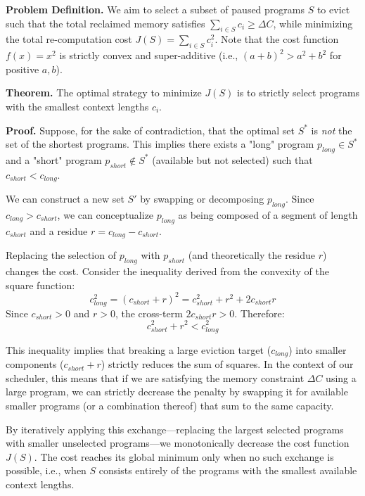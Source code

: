 \textbf{Problem Definition.}
We aim to select a subset of paused programs $S$ to evict such that the total reclaimed memory satisfies $\sum_{i \in S} c_i \ge \Delta C$, while minimizing the total re-computation cost $J(S) = \sum_{i \in S} c_i^2$. Note that the cost function $f(x) = x^2$ is strictly convex and super-additive (i.e., $(a+b)^2 > a^2 + b^2$ for positive $a, b$).

\textbf{Theorem.}
The optimal strategy to minimize $J(S)$ is to strictly select programs with the smallest context lengths $c_i$.

\textbf{Proof.}
Suppose, for the sake of contradiction, that the optimal set $S^*$ is \textit{not} the set of the shortest programs. This implies there exists a "long" program $p_{long} \in S^*$ and a "short" program $p_{short} \notin S^*$ (available but not selected) such that $c_{short} < c_{long}$.

We can construct a new set $S'$ by swapping or decomposing $p_{long}$. Since $c_{long} > c_{short}$, we can conceptualize $p_{long}$ as being composed of a segment of length $c_{short}$ and a residue $r = c_{long} - c_{short}$.

Replacing the selection of $p_{long}$ with $p_{short}$ (and theoretically the residue $r$) changes the cost. Consider the inequality derived from the convexity of the square function:
\begin{equation}
    c_{long}^2 = (c_{short} + r)^2 = c_{short}^2 + r^2 + 2 c_{short} r
\end{equation}
Since $c_{short} > 0$ and $r > 0$, the cross-term $2 c_{short} r > 0$. Therefore:
\begin{equation}
    c_{short}^2 + r^2 < c_{long}^2
\end{equation}

This inequality implies that breaking a large eviction target ($c_{long}$) into smaller components ($c_{short} + r$) strictly reduces the sum of squares.
In the context of our scheduler, this means that if we are satisfying the memory constraint $\Delta C$ using a large program, we can strictly decrease the penalty by swapping it for available smaller programs (or a combination thereof) that sum to the same capacity.

By iteratively applying this exchange—replacing the largest selected programs with smaller unselected programs—we monotonically decrease the cost function $J(S)$. The cost reaches its global minimum only when no such exchange is possible, i.e., when $S$ consists entirely of the programs with the smallest available context lengths.

